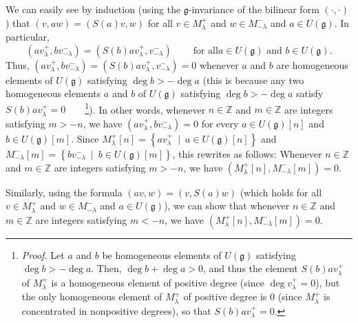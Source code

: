 \documentclass[etingof-lie.tex]{subfiles}
\begin{document}
We can easily see by induction (using the $\mathfrak{g}$-invariance of the
bilinear form $\left(  \cdot,\cdot\right)  $) that $\left(  v,aw\right)
=\left(  S\left(  a\right)  v,w\right)  $ for all $v\in M_{\lambda}^{+}$ and
$w\in M_{-\lambda}^{-}$ and $a\in U\left(  \mathfrak{g}\right)  $. In
particular,%
\[
\left(  av_{\lambda}^{+},bv_{-\lambda}^{-}\right)  =\left(  S\left(  b\right)
av_{\lambda}^{+},v_{-\lambda}^{-}\right)  \ \ \ \ \ \ \ \ \ \ \text{for all
}a\in U\left(  \mathfrak{g}\right)  \text{ and }b\in U\left(  \mathfrak{g}%
\right)  .
\]
Thus, $\left(  av_{\lambda}^{+},bv_{-\lambda}^{-}\right)  =\left(  S\left(
b\right)  av_{\lambda}^{+},v_{-\lambda}^{-}\right)  =0$ whenever $a$ and $b$
are homogeneous elements of $U\left(  \mathfrak{g}\right)  $ satisfying $\deg
b>-\deg a$ (this is because any two homogeneous elements $a$ and $b$ of
$U\left(  \mathfrak{g}\right)  $ satisfying $\deg b>-\deg a$ satisfy $S\left(
b\right)  av_{\lambda}^{+}=0$\ \ \ \ \footnote{\textit{Proof.} Let $a$ and $b$
be homogeneous elements of $U\left(  \mathfrak{g}\right)  $ satisfying $\deg
b>-\deg a$. Then, $\deg b+\deg a>0$, and thus the element $S\left(  b\right)
av_{\lambda}^{+}$ of $M_{\lambda}^{+}$ is a homogeneous element of positive
degree (since $\deg v_{\lambda}^{+}=0$), but the only homogeneous element of
$M_{\lambda}^{+}$ of positive degree is $0$ (since $M_{\lambda}^{+}$ is
concentrated in nonpositive degrees), so that $S\left(  b\right)  av_{\lambda
}^{+}=0$.}). In other words, whenever $n\in\mathbb{Z}$ and $m\in\mathbb{Z}$
are integers satisfying $m>-n$, we have $\left(  av_{\lambda}^{+}%
,bv_{-\lambda}^{-}\right)  =0$ for every $a\in U\left(  \mathfrak{g}\right)
\left[  n\right]  $ and $b\in U\left(  \mathfrak{g}\right)  \left[  m\right]
$. Since $M_{\lambda}^{+}\left[  n\right]  =\left\{  av_{\lambda}^{+}%
\ \mid\ a\in U\left(  \mathfrak{g}\right)  \left[  n\right]  \right\}  $ and
$M_{-\lambda}^{-}\left[  m\right]  =\left\{  bv_{-\lambda}^{-}\ \mid\ b\in
U\left(  \mathfrak{g}\right)  \left[  m\right]  \right\}  $, this rewrites as
follows: Whenever $n\in\mathbb{Z}$ and $m\in\mathbb{Z}$ are integers
satisfying $m>-n$, we have $\left(  M_{\lambda}^{+}\left[  n\right]
,M_{-\lambda}^{-}\left[  m\right]  \right)  =0$.

Similarly, using the formula $\left(  av,w\right)  =\left(  v,S\left(
a\right)  w\right)  $ (which holds for all $v\in M_{\lambda}^{+}$ and $w\in
M_{-\lambda}^{-}$ and $a\in U\left(  \mathfrak{g}\right)  $), we can show that
whenever $n\in\mathbb{Z}$ and $m\in\mathbb{Z}$ are integers satisfying $m<-n$,
we have $\left(  M_{\lambda}^{+}\left[  n\right]  ,M_{-\lambda}^{-}\left[
m\right]  \right)  =0$.
\end{document}
